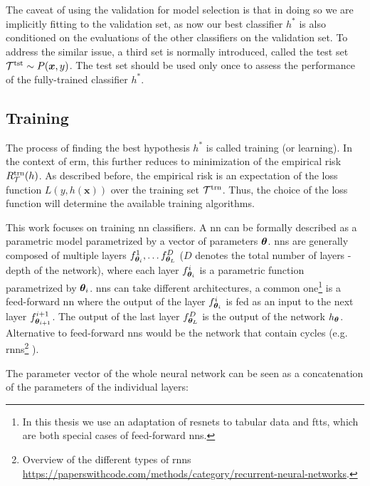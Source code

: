 The caveat of using the validation for model selection is that in doing so we are implicitly fitting to the validation set,
as now our best classifier $h^*$ is also conditioned on the evaluations of the other classifiers on the validation set.
To address the similar issue, a third set is normally introduced, called the test set $\mathcal{T}^\text{tst} \sim P(\bm{x}, y)$. The test
set should be used only once to assess the performance of the fully-trained classifier $h^*$.









\subsection{Training}

The process of finding the best hypothesis $h^*$ is called training (or learning). In the context of \gls{erm}, this
further reduces to minimization of the empirical risk $R_\mathcal{T}^\text{trn}(h)$. As described before, the empirical risk is an
expectation of the loss function $L(y, h(\bm{x}))$ over the training set $\mathcal{T}^\text{trn}$. Thus, the choice of the loss function
will determine the available training algorithms.

This work focuses on training \acrfull{nn} classifiers. A \gls{nn} can be formally described as a parametric model
parametrized by a vector of parameters ${\boldsymbol{\theta}}$. \glspl{nn} are generally composed of multiple layers
$f_{{\boldsymbol{\theta}}_i}^1, \dots f_{{\boldsymbol{\theta}}_L}^D$ ($D$ denotes the total number of layers - depth of the network), where
each layer $f_{{\boldsymbol{\theta}}_i}^i$ is a parametric function parametrized by ${\boldsymbol{\theta}}_i$.  \glspl{nn} can take different
architectures, a common one\footnote{In this thesis we use an adaptation of \glspl{resnet} to tabular data and
    \glspl{ftt}, which are both special cases of feed-forward \glspl{nn}.} is a feed-forward \gls{nn} where the output
of the layer $f_{{\boldsymbol{\theta}}_i}^i$ is fed as an input to the next layer $f_{{\boldsymbol{\theta}}_{i+1}}^{i+1}$. The output
of the last layer $f_{{\boldsymbol{\theta}}_L}^D$ is the output of the network $h_{{\boldsymbol{\theta}}}$. Alternative to feed-forward
\glspl{nn} would be the network that contain cycles (e.g.  \glspl{rnn}\footnote{Overview of the different types of
    \glspl{rnn} \url{https://paperswithcode.com/methods/category/recurrent-neural-networks}.} \cite{rnn,lstm}).

The parameter vector of the whole neural network can be seen as a concatenation of the parameters of the individual
layers:

